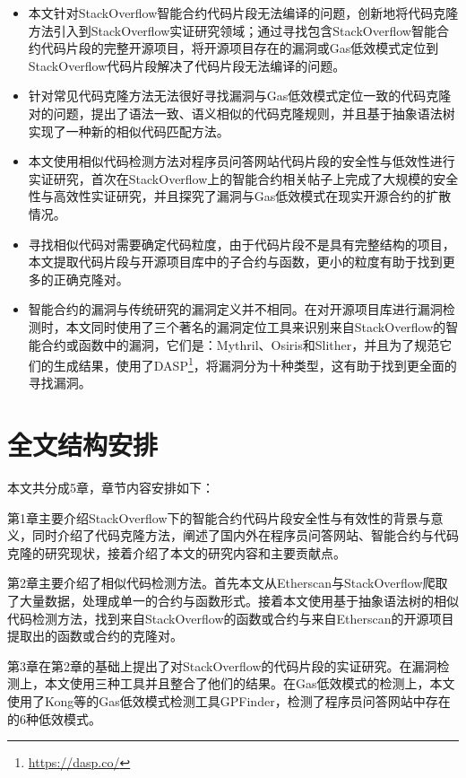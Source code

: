\begin{itemize}

\item 本文针对StackOverflow智能合约代码片段无法编译的问题，创新地将代码克隆方法引入到StackOverflow实证研究领域；通过寻找包含StackOverflow智能合约代码片段的完整开源项目，将开源项目存在的漏洞或Gas低效模式定位到StackOverflow代码片段解决了代码片段无法编译的问题。

\item 针对常见代码克隆方法无法很好寻找漏洞与Gas低效模式定位一致的代码克隆对的问题，提出了语法一致、语义相似的代码克隆规则，并且基于抽象语法树实现了一种新的相似代码匹配方法。

\item 本文使用相似代码检测方法对程序员问答网站代码片段的安全性与低效性进行实证研究，首次在StackOverflow上的智能合约相关帖子上完成了大规模的安全性与高效性实证研究，并且探究了漏洞与Gas低效模式在现实开源合约的扩散情况。

\item 寻找相似代码对需要确定代码粒度，由于代码片段不是具有完整结构的项目，本文提取代码片段与开源项目库中的子合约与函数，更小的粒度有助于找到更多的正确克隆对。

\item 智能合约的漏洞与传统研究的漏洞定义并不相同。在对开源项目库进行漏洞检测时，本文同时使用了三个著名的漏洞定位工具来识别来自StackOverflow的智能合约或函数中的漏洞，它们是：Mythril\cite{Mythril}、Osiris\cite{Osiris}和Slither\cite{Slither}，并且为了规范它们的生成结果，使用了DASP\footnote{\url{https://dasp.co/}}，将漏洞分为十种类型，这有助于找到更全面的寻找漏洞。

\end{itemize}

\section{全文结构安排}
本文共分成5章，章节内容安排如下：

第1章主要介绍StackOverflow下的智能合约代码片段安全性与有效性的背景与意义，同时介绍了代码克隆方法，阐述了国内外在程序员问答网站、智能合约与代码克隆的研究现状，接着介绍了本文的研究内容和主要贡献点。

第2章主要介绍了相似代码检测方法。首先本文从Etherscan与StackOverflow爬取了大量数据，处理成单一的合约与函数形式。接着本文使用基于抽象语法树的相似代码检测方法，找到来自StackOverflow的函数或合约与来自Etherscan的开源项目提取出的函数或合约的克隆对。

第3章在第2章的基础上提出了对StackOverflow的代码片段的实证研究。在漏洞检测上，本文使用三种工具并且整合了他们的结果。在Gas低效模式的检测上，本文使用了Kong等\cite{gasPattern}的Gas低效模式检测工具GPFinder，检测了程序员问答网站中存在的6种低效模式。

